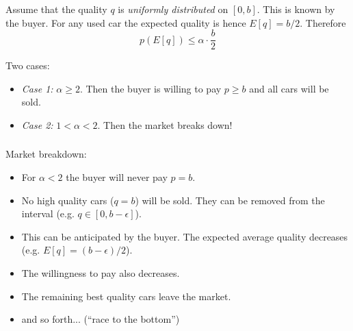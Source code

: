 \documentclass[11pt]{beamer}
\begin{document}
\begin{frame}
\frametitle{\insertsection}

Assume that the quality $q$ is \textit{uniformly distributed} on $[0,b]$. This is known by the buyer.
For any used car the expected quality is hence $E[q]=b/2$. Therefore
$$
p(E[q])\leq \alpha\cdot\frac{b}{2}
$$

Two cases:
\begin{itemize}
\item \textit{Case 1:} $\alpha \geq 2$. Then the buyer is willing to pay $p\geq b$ and all cars will be sold.
\item \textit{Case 2:} $1<\alpha<2$. Then the market breaks down!
\end{itemize}

\end{frame}


\begin{frame}
\frametitle{\insertsection}

Market breakdown:
{\small
\begin{itemize}
\item For $\alpha<2$ the buyer will never pay $p=b$.
\item No high quality cars ($q=b$) will be sold. They can be removed from the interval (e.g. $q\in[0,b-\epsilon]$).
\item This can be anticipated by the buyer. The expected average quality decreases (e.g. $E[q]=(b-\epsilon)/2$).
\item The willingness to pay also decreases.
\item The remaining best quality cars leave the market.
\item and so forth... (``race to the bottom'')
\end{itemize} }
\end{frame}

\end{document}
